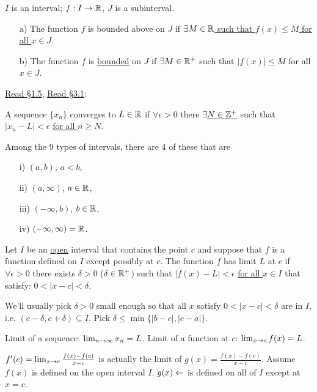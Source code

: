 \documentclass[]{article}
\begin{document}
\begin{definition}
	$I$ is an interval; $f:I\rightarrow \mathbb{R}$, $J$ is a subinterval.
	\begin{enumerate}
		\item[a)] The function $f$ is bounded above on $J$ if \ul{$\exists M\in\mathbb{R}$ such that $f(x) \leq M$ for all $x\in J$}.
		\item[b)] The function $f$ is \ul{bounded} on $J$ if $\exists M\in\mathbb{R}^+$ such that $|f(x)| \leq M$ for all $x\in J$.
	\end{enumerate}
\end{definition}
\newpage
\ul{Read \S1.5}, 
\ul{Read \S3.1}:
\begin{recall}
	A sequence $\{x_n\}$ converges to $L\in \mathbb{R}$ if $\forall \epsilon>0$ there $\exists \underline{N\in\mathbb{Z}^+}$ such that $|x_n-L|<\epsilon$ \ul{for all $n\geq N$}.
\end{recall}
\begin{remark}
	Among the 9 types of intervals, there are 4 of these that are \ul{}
	\begin{enumerate}
		\item[i)] $(a,b)$, $a<b$,
		\item[ii)] $(a,\infty)$, $a\in\mathbb{R}$,
		\item[iii)] $(-\infty,b)$, $b\in\mathbb{R}$,
		\item[iv)] $(-\infty,\infty) = \mathbb{R}$.
	\end{enumerate}
\end{remark}
\begin{definition}
	Let $I$ be an \ul{open} interval that contains the point $c$ and suppose that $f$ is a function defined on $I$ except possibly at $c$. The function $f$ has limit $L$ at $c$ if $\forall \epsilon>0$ there exists \ul{$\delta>0$} ($\delta\in\mathbb{R}^+$) such that $|f(x)-L| <\epsilon$ \ul{for all $x\in I$} that satisfy: \ul{$0<|x-c|<\delta$}.
\end{definition}
\begin{remark}
	We'll usually pick $\delta>0$ small enough so that all $x$ satisfy $0<|x-c|<\delta$ are in $I$, i.e. $(c-\delta,c+\delta)\subseteq I$.
	Pick $\delta \leq \min{\{|b-c|,|c-a|\}}$.
\end{remark}
\begin{note}
	 Limit of a sequence: $\lim_{n\rightarrow\infty} x_n = L$. Limit of a function at $c$: $\lim_{x\rightarrow c} f(x) = L$.
\end{note}
\begin{note}
	$f'(c) = \lim_{x\rightarrow c} \frac{f(x)-f(c)}{x-c}$ is actually the limit of $g(x) = \frac{f(x)-f(c)}{x-c}$. Assume $f(x)$ is defined on the open interval $I$. $g(x) \leftarrow$ is defined on all of $I$ except at $x=c$.
\end{note}
\end{document}
